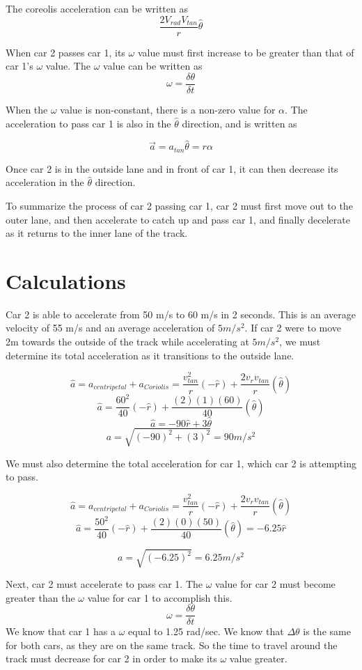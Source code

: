 \documentclass{article}
\begin{document}
The coreolis acceleration can be written as
\[ \frac{2V_{rad}V_{tan}} {r}  \hat{\theta}\]

When car 2 passes car 1, its $\omega$ value must first increase to be greater than that of car 1's $\omega$ value. The $\omega$ value can be written as  
\[\omega = \frac{\delta \theta} {\delta t}\]

When the $\omega$ value is non-constant, there is a non-zero value for $\alpha$. The acceleration to pass car 1 is also in the $\hat{\theta}$ direction, and is written as 

\[ \vec{a} = a_{tan} \hat{\theta} = r\alpha\]

Once car 2 is in the outside lane and in front of car 1, it can then decrease its acceleration in the $\hat{\theta}$ direction.

To summarize the process of car 2 passing car 1, car 2 must first move out to the outer lane, and then accelerate to catch up and pass car 1, and finally decelerate as it returns to the inner lane of the track. 

\section{Calculations}

Car 2 is able to accelerate from 50 m/s to 60 m/s in 2 seconds. This is an average velocity of 55 m/s and an average acceleration of $5 m/s^2$. If car 2 were to move 2m towards the outside of the track while accelerating at $5 m/s^2$, we must determine its total acceleration as it transitions to the outside lane. 

\[\hat{a} = a_{centripetal} + a_{Coriolis} = \frac{v_{tan}^2}{r}(-\hat{r})+ \frac{2v_r v_{tan}} {r}(\hat{\theta}) \]
\[ \hat{a} = \frac{60^2}{40} (-\hat{r}) + \frac{(2)(1)(60)}{40}(\hat{\theta}) \]
\[ \hat{a} = -90 \hat{r} + 3 \hat{\theta} \]
\[ a = \sqrt{(-90)^2 + (3)^2} = 90 m/s^2 \]

We must also determine the total acceleration for car 1, which car 2 is attempting to pass. 

\[\hat{a} = a_{centripetal} + a_{Coriolis} = \frac{v_{tan}^2}{r}(-\hat{r})+ \frac{2v_r v_{tan}} {r}(\hat{\theta}) \]
\[\hat{a} = \frac{50^2}{40} (-\hat{r}) + \frac{(2)(0)(50)}{40}(\hat{\theta}) = -6.25 \hat{r} \]

\[ a = \sqrt{(-6.25)^2} = 6.25 m/s^2 \]


Next, car 2 must accelerate to pass car 1. The $\omega$ value for car 2 must become greater than the $\omega$ value for car 1 to accomplish this. 
\[\omega = \frac{\delta \theta} {\delta t}\]
We know that car 1 has a $\omega$ equal to 1.25 rad/sec. We know that $\Delta \theta$ is the same for both cars, as they are on the same track. So the time to travel around the track must decrease for car 2 in order to make its $\omega$ value greater.
\end{document}
